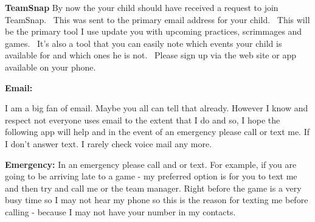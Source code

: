 \documentclass[10pt,letterpaper]{article}
\newenvironment{agendablock}[1]{%
    \tcolorbox[beamer,%
    noparskip,breakable,
    colback=LightGray,colframe=Black,%
    colbacklower=Gray!75!LightGray,%
    title=#1]}%
    {\endtcolorbox}
\newenvironment{evenBlock}[1]{%
    \tcolorbox[beamer,%
    noparskip,breakable,
    colback=LightGreen,colframe=DarkGreen,%
    colbacklower=LimeGreen!75!LightGreen,%
    title=#1]}%
    {\endtcolorbox}
\begin{document}
\begin{evenBlock}{Communication Preferences}
    
    \textbf{TeamSnap}
    By now the your child should have received a request to join TeamSnap.  This was sent to the primary email address for your child.  This will be the primary tool I use update you with upcoming practices, scrimmages and games.  It's also a tool that you can easily note which events your child is available for and which ones he is not.  Please sign up via the web site or app available on your phone.

    
    \textbf{Email:}
    
    I am a big fan of email.  Maybe you all can tell that already.  However I know and respect not everyone uses email to the extent that I do and so, I hope the following app will help and in the event of an emergency please call or text me.  If I don't answer text.  I rarely check voice mail any more.

    \textbf{Emergency:}
    In an emergency please call and or text.  For example, if you are going to be arriving late to a game - my preferred option is for you to text me and then try and call me or the team manager.  Right before the game is a very busy time so I may not hear my phone so this is the reason for texting me before calling - because I may not have your number in my contacts.

\end{evenBlock}

\begin{agendablock}{Questions}
    
\end{agendablock}
\end{document}
